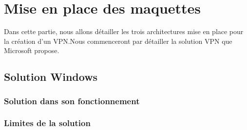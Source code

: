 \section{Mise en place des maquettes}

	Dans cette partie, nous allons détailler les trois architectures mise en place pour la création d'un VPN.Nous commenceront par détailler la solution VPN que Microsoft propose.

\subsection{Solution Windows}


\subsubsection{Solution dans son fonctionnement}
\subsubsection{Limites de la solution}
% 






\pagebreak
